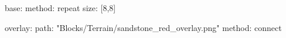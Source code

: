 base:
  method: repeat
  size: [8,8]

overlay:
  path: "Blocks/Terrain/sandstone_red_overlay.png"
  method: connect